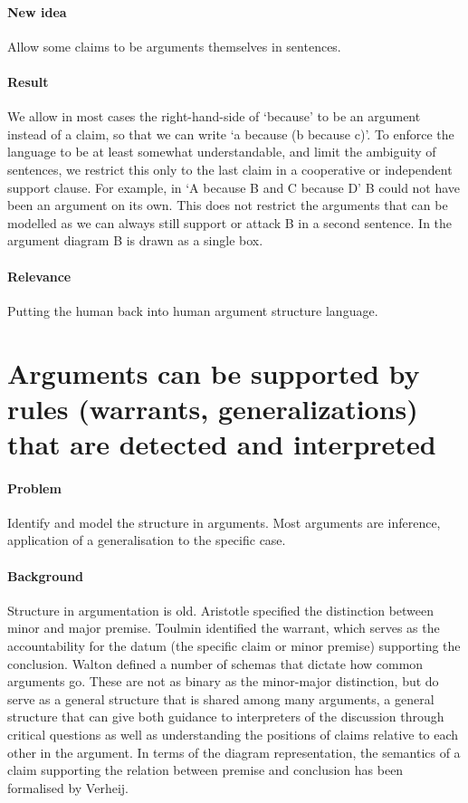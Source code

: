 \documentclass{article}
\let\stdsection\section
\renewcommand\section{\newpage\stdsection}
\begin{document}
\paragraph{New idea} Allow some claims to be arguments themselves in sentences.
\paragraph{Result} We allow in most cases the right-hand-side of `because' to be an argument instead of a claim, so that we can write `a because (b because c)'. To enforce the language to be at least somewhat understandable, and limit the ambiguity of sentences, we restrict this only to the last claim in a cooperative or independent support clause. For example, in `A because B and C because D' B could not have been an argument on its own. This does not restrict the arguments that can be modelled as we can always still support or attack B in a second sentence. In the argument diagram B is drawn as a single box.
\paragraph{Relevance} Putting the human back into human argument structure language.

\section{Arguments can be supported by rules (warrants, generalizations) that are detected and interpreted}

\paragraph{Problem} Identify and model the structure in arguments. Most arguments are inference, application of a generalisation to the specific case.
\paragraph{Background} Structure in argumentation is old. Aristotle specified the distinction between minor and major premise. Toulmin identified the warrant, which serves as the accountability for the datum (the specific claim or minor premise) supporting the conclusion. Walton defined a number of schemas that dictate how common arguments go. These are not as binary as the minor-major distinction, but do serve as a general structure that is shared among many arguments, a general structure that can give both guidance to interpreters of the discussion through critical questions as well as understanding the positions of claims relative to each other in the argument. In terms of the diagram representation, the semantics of a claim supporting the relation between premise and conclusion has been formalised by Verheij. 
\end{document}
